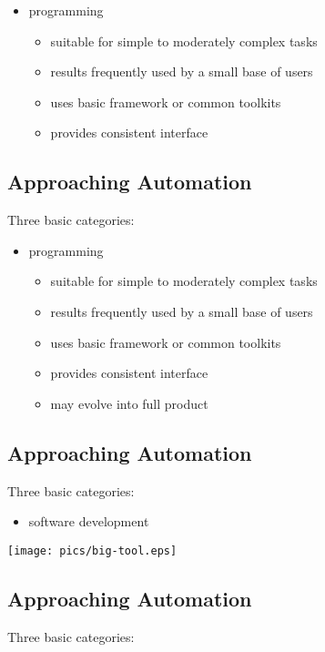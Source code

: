 \documentclass[xga]{xdvislides}
\begin{document}
\begin{itemize}
	\item programming
		\begin{itemize}
			\item suitable for simple to moderately complex tasks
			\item results frequently used by a small base of users
			\item uses basic framework or common toolkits
			\item provides consistent interface
		\end{itemize}
\end{itemize}

\subsection{Approaching Automation}
Three basic categories:
\\

\begin{itemize}
	\item programming
		\begin{itemize}
			\item suitable for simple to moderately complex tasks
			\item results frequently used by a small base of users
			\item uses basic framework or common toolkits
			\item provides consistent interface
			\item may evolve into full product
		\end{itemize}
\end{itemize}

\subsection{Approaching Automation}
Three basic categories:
\\

\begin{itemize}
	\item software development
\end{itemize}
\vspace*{\fill}
\begin{center}
	\texttt{[image: pics/big-tool.eps]}
\end{center}
\vspace*{\fill}


\subsection{Approaching Automation}
Three basic categories:
\\
\end{document}
